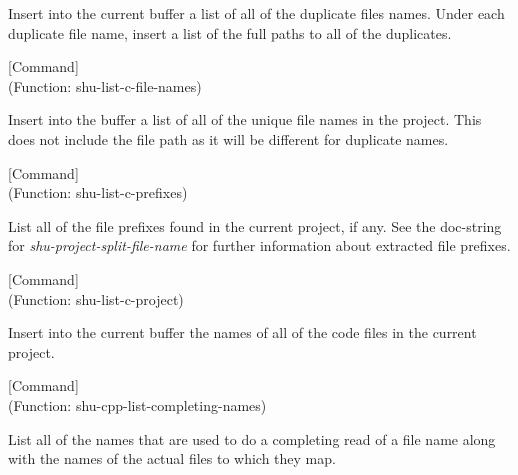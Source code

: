 \begin{doc-string}
Insert into the current buffer a list of all of the duplicate files names.
Under each duplicate file name, insert a list of the full paths to all of the
duplicates.
\end{doc-string}

\vspace{1em}
\noindent
{}
\usebox{\funcname}
 \hfill [Command]\\%
 (Function: shu-list-c-file-names)

\begin{doc-string}
Insert into the buffer a list of all of the unique file names in the project.
This does not include the file path as it will be different for duplicate
names.
\end{doc-string}

\vspace{1em}
\noindent
{}
\usebox{\funcname}
 \hfill [Command]\\%
 (Function: shu-list-c-prefixes)

\begin{doc-string}
List all of the file prefixes found in the current project, if any.
See the doc-string for \emph{shu-project-split-file-name} for further information
about extracted file prefixes.
\end{doc-string}

\vspace{1em}
\noindent
{}
\usebox{\funcname}
 \hfill [Command]\\%
 (Function: shu-list-c-project)

\begin{doc-string}
Insert into the current buffer the names of all of the code files in the
current project.
\end{doc-string}

\vspace{1em}
\noindent
{}
\usebox{\funcname}
 \hfill [Command]\\%
 (Function: shu-cpp-list-completing-names)

\begin{doc-string}
List all of the names that are used to do a completing read of a file name
along with the names of the actual files to which they map.
\end{doc-string}

